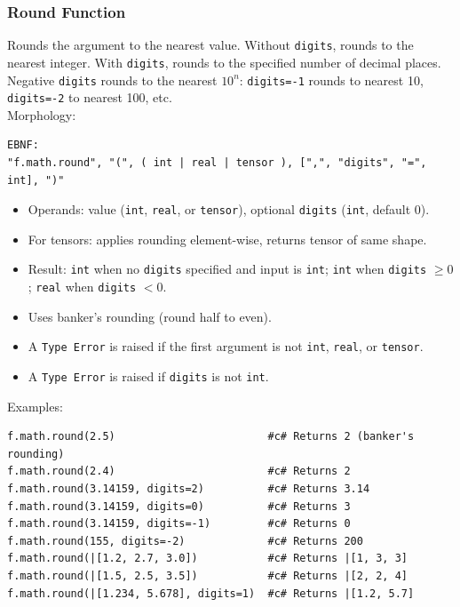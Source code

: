 \subsubsection{Round Function}
Rounds the argument to the nearest value. Without \texttt{digits}, rounds to the nearest integer. With \texttt{digits}, rounds to the specified number of decimal places. Negative \texttt{digits} rounds to the nearest $10^n$: \texttt{digits=-1} rounds to nearest 10, \texttt{digits=-2} to nearest 100, etc. \\
Morphology:
\begin{verbatim}
EBNF:
"f.math.round", "(", ( int | real | tensor ), [",", "digits", "=", int], ")"
\end{verbatim}
\begin{itemize}
\item Operands: value (\texttt{int}, \texttt{real}, or \texttt{tensor}), optional \texttt{digits} (\texttt{int}, default 0).
\item For tensors: applies rounding element-wise, returns tensor of same shape.
\item Result: \texttt{int} when no \texttt{digits} specified and input is \texttt{int}; \texttt{int} when \texttt{digits} $\geq 0$; \texttt{real} when \texttt{digits} $< 0$.
\item Uses banker's rounding (round half to even).
\item A \texttt{Type Error} is raised if the first argument is not \texttt{int}, \texttt{real}, or \texttt{tensor}.
\item A \texttt{Type Error} is raised if \texttt{digits} is not \texttt{int}.
\end{itemize}
Examples:
\begin{verbatim}
f.math.round(2.5)                        #c# Returns 2 (banker's rounding)
f.math.round(2.4)                        #c# Returns 2
f.math.round(3.14159, digits=2)          #c# Returns 3.14
f.math.round(3.14159, digits=0)          #c# Returns 3
f.math.round(3.14159, digits=-1)         #c# Returns 0
f.math.round(155, digits=-2)             #c# Returns 200
f.math.round(|[1.2, 2.7, 3.0])           #c# Returns |[1, 3, 3]
f.math.round(|[1.5, 2.5, 3.5])           #c# Returns |[2, 2, 4]
f.math.round(|[1.234, 5.678], digits=1)  #c# Returns |[1.2, 5.7]
\end{verbatim}


